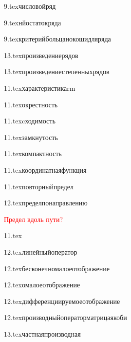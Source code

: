 {9.tex}{числовойряд}

{9.tex}{нйостатокряда}

{9.tex}{критерийбольцанокошидляряда}

{13.tex}{произведениерядов}

{13.tex}{произведениестепенныхрядов}

{11.tex}{характеристикаrm}

{11.tex}{окрестность}

{11.tex}{cходимость}
\label{сходимость}

{11.tex}{замкнутость}

{11.tex}{компактность}

{11.tex}{координатнаяфункция}

{11.tex}{повторныйпредел}

{12.tex}{пределпонаправлению}

\textcolor{red}{Предел вдоль пути?}

{11.tex}{}

{12.tex}{линейныйоператор}

{12.tex}{бесконечномалоеотображение}

{12.tex}{омалоеотображение}

{12.tex}{дифференциируемоеотображение}

{12.tex}{производныйоператорматрицаякоби}

{13.tex}{частнаяпроизводная}

